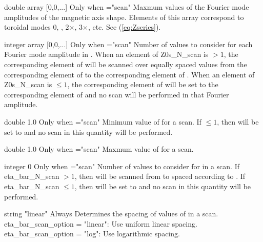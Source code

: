 \myhrule

{double array}
{[0,0,...]}
{Only when ={\ttfamily "scan"}}
{Maxmum values of the Fourier mode amplitudes of the magnetic axis shape. Elements of this array correspond to toroidal modes 0, , 2$\times$, 3$\times$, etc.  See (\ref{eq:Zseries}).
}

\myhrule

{integer array}
{[0,0,...]}
{Only when ={\ttfamily "scan"}}
{Number of values to consider for each Fourier mode amplitude in . When an element of {\ttfamily Z0s\_N\_scan} is $>1$, the corresponding element of  will be scanned over equally spaced values from the corresponding element of  to the corresponding element of .  When an element of {\ttfamily Z0s\_N\_scan} is $\le 1$, the corresponding element of  will be set to the corresponding element of  and no scan will be performed in that Fourier amplitude.
}

\myhrule

{double}
{1.0}
{Only when ={\ttfamily "scan"}}
{Minimum value of  for a scan. If $\le 1$, then  will be set to  and no scan in this quantity will be performed.
}

\myhrule

{double}
{1.0}
{Only when ={\ttfamily "scan"}}
{Maxmum value of  for a scan.
}

\myhrule

{integer}
{0}
{Only when ={\ttfamily "scan"}}
{Number of values to consider for  in a scan. If {\ttfamily eta\_bar\_N\_scan} $>1$, then  will be scanned from  to  spaced according to .
If {\ttfamily eta\_bar\_N\_scan} $\le 1$, then  will be set to  and no scan in
this quantity will be performed.
}

\myhrule

{string}
{{\ttfamily "linear"}}
{Always}
{Determines the spacing of values of  in a scan.\\

{\ttfamily eta\_bar\_scan\_option} = {\ttfamily "linear"}: Use uniform linear spacing.\\

{\ttfamily eta\_bar\_scan\_option} = {\ttfamily "log"}: Use logarithmic spacing.\\

}

